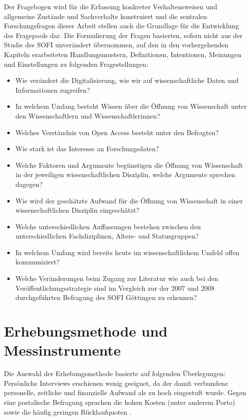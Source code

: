 Der Fragebogen wird für die Erfassung konkreter Verhaltensweisen und allgemeine Zustände und Sachverhalte \cite{raab_2012_fragebogen} konstruiert und die zentralen Forschungsfragen dieser Arbeit stellen auch die Grundlage für die Entwicklung des Fragepools dar. Die Formulierung der Fragen basierten, sofern nicht aus der Studie des SOFI unverändert übernommen, auf den in den vorhergehenden Kapiteln erarbeiteten Handlungsmustern, Definitionen, Intentionen, Meinungen und Einstellungen zu folgenden Fragestellungen:
\begin{itemize}
\item Wie verändert die Digitalisierung, wie wir auf wissenschaftliche Daten und Informationen zugreifen?
\item In welchem Umfang besteht Wissen über die Öffnung von Wissenschaft unter den Wissenschaftlern und Wissenschaftlerinnen?
\item Welches Verständnis von Open Access besteht unter den Befragten?
\item Wie stark ist das Interesse an Forschungsdaten?
\item Welche Faktoren und Argumente begünstigen die Öffnung von Wissenschaft in der jeweiligen wissenschaftlichen Disziplin, welche Argumente sprechen dagegen?
\item Wie wird der geschätzte Aufwand für die Öffnung von Wissenschaft in einer wissenschaftlichen Disziplin eingeschätzt?
\item Welche unterschiedlichen Auffassungen bestehen zwischen den unterschiedlichen Fachdiziplinen, Alters- und Statusgruppen?
\item In welchem Umfang wird bereits heute im wissenschaftlichem Umfeld offen kommuniziert?
\item Welche Veränderungen beim Zugang zur Literatur wie auch bei den Veröffentlichungsstrategie sind im Vergleich zur der 2007 und 2008 durchgeführten Befragung des SOFI Göttingen zu erkennen?
\end{itemize}

\section{Erhebungsmethode und Messinstrumente}

Die Auswahl der Erhebungsmethode basierte auf folgenden Überlegungen: Persönliche Interviews erschienen wenig geeignet, da der damit verbundene personelle, zeitliche und finanzielle Aufwand als zu hoch eingestuft wurde. Gegen eine postalische Befragung sprachen die hohen Kosten (unter anderem Porto) sowie die häufig geringen Rücklaufquoten \cite{suchen}.

